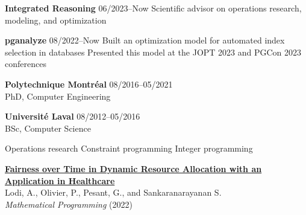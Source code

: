 \documentclass{memoir}
\begin{document}
\par
\vspace{1.5\baselineskip}
\begin{list}{}{
    \setlength\leftmargin{1.2in}
    \setlength\rightmargin{0in}
    \setlength{}
    \setlength{}
    \setlength\listparindent{0in}
    \setlength\itemindent{0in}
    \setlength\parskip{0in}
    \setlength\topsep{0in}
    \setlength\parsep{0in}
    \setlength\itemsep{0.90\baselineskip}
    \setlength\partopsep{0in}}

  


  \Item \textbf{Integrated Reasoning} \hfill 06/2023--Now
  \BulletItem Scientific advisor on operations research, modeling, and optimization
  
  \Item \textbf{pganalyze} \hfill 08/2022--Now
  \BulletItem Built an optimization model for automated index selection in databases
  \BulletItem Presented this model at the JOPT 2023 and PGCon 2023 conferences




  

  \Item \textbf{Polytechnique Montréal} \hfill 08/2016--05/2021 \\
  PhD, Computer Engineering

  \Item \textbf{Université Laval} \hfill 08/2012--05/2016 \\
  BSc, Computer Science

  

  
  \BulletItem Operations research
  \BulletItem Constraint programming
  \BulletItem Integer programming

  

  \Item \href{https://doi.org/10.1007/s10107-022-01904-6}{\textbf{Fairness over Time in Dynamic Resource Allocation with an Application in Healthcare}} \\
  Lodi, A., Olivier, P., Pesant, G., and Sankaranarayanan S. \\
  \emph{Mathematical Programming} (2022)


\end{list}
\end{document}
